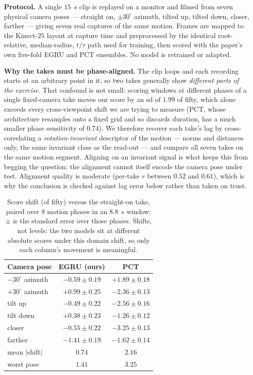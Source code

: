 \documentclass[10pt,twocolumn,letterpaper]{article}
\begin{document}
\textbf{Protocol.} A single $15$~s clip is replayed on a monitor and filmed from seven physical camera
poses --- straight on, $\pm30^\circ$ azimuth, tilted up, tilted down, closer, farther --- giving seven
real captures of the same motion. Frames are mapped to the Kinect-$25$ layout at capture time and
preprocessed by the identical root-relative, median-radius, $t/\tau$ path used for training, then
scored with the paper's own five-fold EGRU and PCT ensembles. No model is retrained or adapted.

\textbf{Why the takes must be phase-aligned.} The clip loops and each recording starts at an arbitrary
point in it, so two takes generally show \emph{different parts of the exercise}. That confound is not
small: scoring windows at different phases of a single fixed-camera take moves our score by an sd of
$1.99$ of fifty, which alone exceeds every cross-viewpoint shift we are trying to measure (PCT, whose
architecture resamples onto a fixed grid and so discards duration, has a much smaller phase
sensitivity of $0.74$). We therefore recover each take's lag by cross-correlating a
\emph{rotation-invariant} descriptor of the motion --- norms and distances only, the same invariant
class as the read-out --- and compare all seven takes on the same motion segment. Aligning on an
invariant signal is what keeps this from begging the question: the alignment cannot itself encode the
camera pose under test. Alignment quality is moderate (per-take $r$ between $0.52$ and $0.61$), which
is why the conclusion is checked against lag error below rather than taken on trust.

\begin{table}[h]
\centering\small
\setlength{\tabcolsep}{5pt}
\begin{tabular}{lcc}
\toprule
Camera pose & EGRU (ours) & PCT \\
\midrule
$-30^\circ$ azimuth & $-0.59 \pm 0.19$ & $+1.89 \pm 0.18$ \\
$+30^\circ$ azimuth & $+0.99 \pm 0.25$ & $-2.36 \pm 0.13$ \\
tilt up             & $-0.49 \pm 0.22$ & $-2.56 \pm 0.16$ \\
tilt down           & $+0.38 \pm 0.23$ & $-1.26 \pm 0.12$ \\
closer              & $-0.55 \pm 0.22$ & $-3.25 \pm 0.13$ \\
farther             & $-1.41 \pm 0.19$ & $-1.62 \pm 0.14$ \\
\midrule
mean $|$shift$|$    & $\mathbf{0.74}$  & $2.16$ \\
worst pose          & $\mathbf{1.41}$  & $3.25$ \\
\bottomrule
\end{tabular}
\caption{Score shift (of fifty) versus the straight-on take, paired over $8$ motion phases in an
$8.8$~s window; $\pm$ is the standard error over those phases. Shifts, not levels: the two models sit
at different absolute scores under this domain shift, so only each column's movement is meaningful.}
\label{tab:supp:realview}
\end{table}
\end{document}
